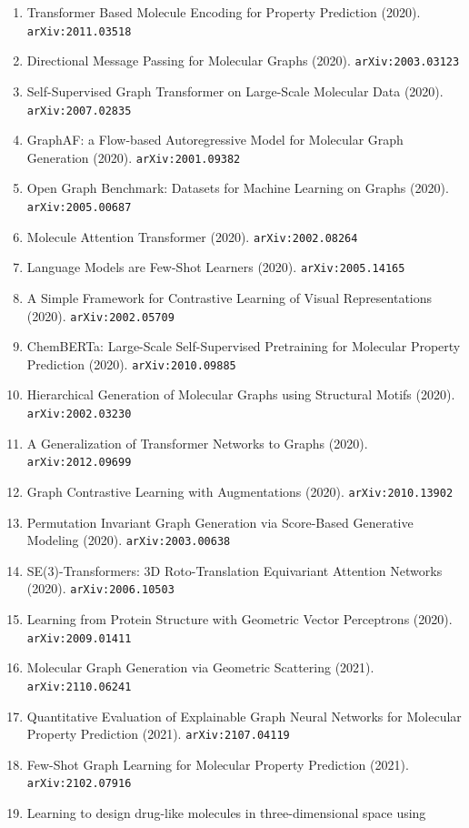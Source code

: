 \documentclass[11pt]{article}
\begin{document}
\begin{enumerate}
  \item Transformer Based Molecule Encoding for Property Prediction (2020). \texttt{arXiv:2011.03518}
  \item Directional Message Passing for Molecular Graphs (2020). \texttt{arXiv:2003.03123}
  \item Self-Supervised Graph Transformer on Large-Scale Molecular Data (2020). \texttt{arXiv:2007.02835}
  \item GraphAF: a Flow-based Autoregressive Model for Molecular Graph
  Generation (2020). \texttt{arXiv:2001.09382}
  \item Open Graph Benchmark: Datasets for Machine Learning on Graphs (2020). \texttt{arXiv:2005.00687}
  \item Molecule Attention Transformer (2020). \texttt{arXiv:2002.08264}
  \item Language Models are Few-Shot Learners (2020). \texttt{arXiv:2005.14165}
  \item A Simple Framework for Contrastive Learning of Visual Representations (2020). \texttt{arXiv:2002.05709}
  \item ChemBERTa: Large-Scale Self-Supervised Pretraining for Molecular
  Property Prediction (2020). \texttt{arXiv:2010.09885}
  \item Hierarchical Generation of Molecular Graphs using Structural Motifs (2020). \texttt{arXiv:2002.03230}
  \item A Generalization of Transformer Networks to Graphs (2020). \texttt{arXiv:2012.09699}
  \item Graph Contrastive Learning with Augmentations (2020). \texttt{arXiv:2010.13902}
  \item Permutation Invariant Graph Generation via Score-Based Generative
  Modeling (2020). \texttt{arXiv:2003.00638}
  \item SE(3)-Transformers: 3D Roto-Translation Equivariant Attention Networks (2020). \texttt{arXiv:2006.10503}
  \item Learning from Protein Structure with Geometric Vector Perceptrons (2020). \texttt{arXiv:2009.01411}
  \item Molecular Graph Generation via Geometric Scattering (2021). \texttt{arXiv:2110.06241}
  \item Quantitative Evaluation of Explainable Graph Neural Networks for
  Molecular Property Prediction (2021). \texttt{arXiv:2107.04119}
  \item Few-Shot Graph Learning for Molecular Property Prediction (2021). \texttt{arXiv:2102.07916}
  \item Learning to design drug-like molecules in three-dimensional space using

\end{enumerate}
\end{document}
